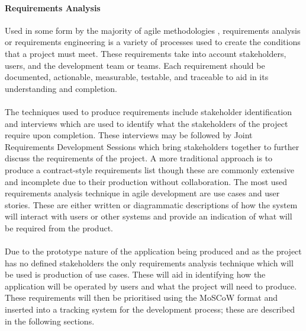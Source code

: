 		\paragraph{Requirements Analysis}
			Used in some form by the majority of agile methodologies , requirements analysis or requirements engineering is a variety of processes used to create the conditions that a project must meet. These requirements take into account stakeholders, users, and the development team or teams. Each requirement should be documented, actionable, measurable, testable, and traceable to aid in its understanding and completion.
			\\\\
			The techniques used to produce requirements include stakeholder identification and interviews which are used to identify what the stakeholders of the project require upon completion. These interviews may be followed by Joint Requirements Development Sessions which bring stakeholders together to further discuss the requirements of the project. A more traditional approach is to produce a contract-style requirements list though these are commonly extensive and incomplete due to their production without collaboration. The most used requirements analysis technique in agile development are use cases and user stories. These are either written or diagrammatic descriptions of how the system will interact with users or other systems and provide an indication of what will be required from the product.
			\\\\
			Due to the prototype nature of the application being produced and as the project has no defined stakeholders the only requirements analysis technique which will be used is production of use cases. These will aid in identifying how the application will be operated by users and what the project will need to produce. These requirements will then be prioritised using the MoSCoW format and inserted into a tracking system for the development process; these are described in the following sections.
